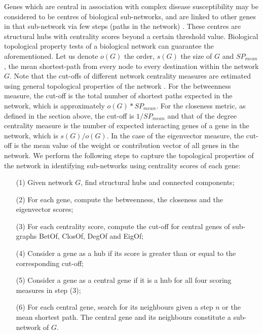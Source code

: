 \documentclass[10pt]{article}
\begin{document}
Genes which are central in association with complex disease susceptibility may be considered to be centres of biological sub-networks, and are linked to other genes in that sub-network via few steps (paths in the network) \cite{jia}. These centres are structural hubs with centrality scores beyond a certain threshold value. Biological topological property tests of a biological network can guarantee the aforementioned. Let us denote $o\left(G\right)$ the order, $s\left(G\right)$ the size of $G$ and $SP_{mean}$, the mean shortest-path  from every node to every destination within the network $G$. Note that the cut-offs of different network centrality measures are estimated using general topological properties of the network \cite{add1}. For the betweenness measure, the cut-off is the total number of shortest paths expected in the network, which is approximately $o(G)*SP_{mean}$. For the closeness metric, as defined in the section above, the cut-off is $1/SP_{mean}$ and that of the degree centrality measure is the number of expected interacting genes of a gene in the network, which is $s(G)/o(G)$. In the case of the eigenvector measure, the cut-off is the mean value of the weight or contribution vector of all genes in the network. We perform the following steps to capture the topological properties of the network in identifying sub-networks using centrality scores of each gene:

 \begin{enumerate}
\item[(1)] Given network $G$, find structural hubs and connected components; 
\item[(2)] For each gene, compute the betweenness, the closeness and the eigenvector scores; 
\item[(3)] For each centrality score, compute the cut-off for central genes of sub-graphs BetOf, ClosOf, DegOf and EigOf; 
\item[(4)] Consider a gene as a hub if its score is greater than or equal to the corresponding cut-off; 
\item[(5)] Consider a gene as a central gene if it is a hub for all four scoring measures in step (3); 
\item[(6)] For each central gene, search for its neighbours given a step $n$ or the mean shortest path. The central gene and its neighbours constitute a sub-network of $G$. 
\end{enumerate}
\end{document}
